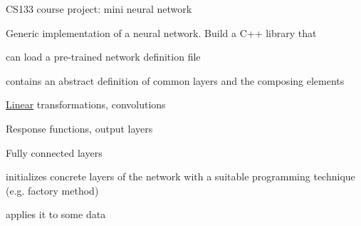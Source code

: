 C\+S133 course project\+: mini neural network

Generic implementation of a neural network. Build a C++ library that
\begin{DoxyItemize}
\item can load a pre-\/trained network definition file
\item contains an abstract definition of common layers and the composing elements
\begin{DoxyItemize}
\item \mbox{\hyperlink{class_linear}{Linear}} transformations, convolutions
\item Response functions, output layers
\item Fully connected layers
\end{DoxyItemize}
\item initializes concrete layers of the network with a suitable programming technique (e.\+g. factory method)
\item applies it to some data 
\end{DoxyItemize}